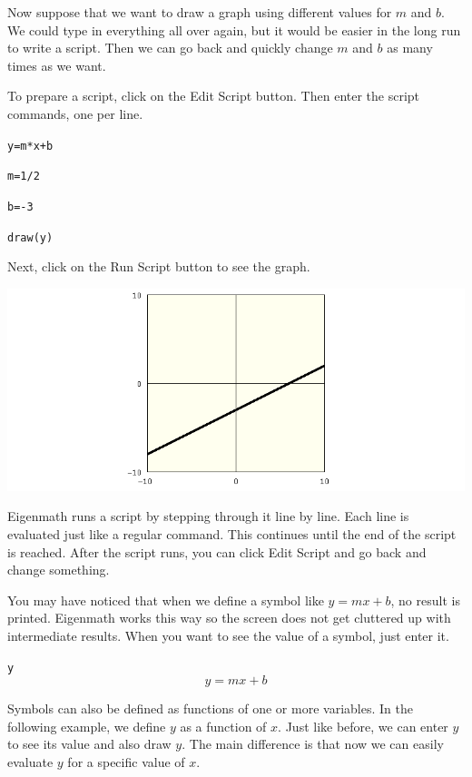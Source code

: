 \documentclass[12pt,openany]{report}
\begin{document}
\noindent
Now suppose that we want to draw a graph
using different values for $m$ and $b$.
We could type in everything all over again, but it would be easier
in the long run to write a script.
Then we can go back and quickly change $m$ and $b$ as many times as we want.

\medskip
\noindent
To prepare a script, click on the Edit Script button.
Then enter the script commands, one per line.

\medskip
{\tt y=m*x+b}

{\tt m=1/2}

{\tt b=-3}

{\tt draw(y)}

\medskip
\noindent
Next, click on the Run Script button to see the graph.

\medskip
\begin{center}
\includegraphics[scale=0.5]{1.png}
\end{center}

\medskip
\noindent
Eigenmath runs a script by stepping through it line by line.
Each line is evaluated just like a regular command.
This continues until the end of the script is reached.
After the script runs, you can click Edit Script and go back and change something.

\newpage

\noindent
You may have noticed that when we define a symbol
like $y=mx+b$, no result is printed.
Eigenmath works this way so the screen does not get cluttered
up with intermediate results.
When you want to see the value of a symbol, just enter it.

\medskip
{\tt y}
$$y=mx+b$$

\medskip
\noindent
Symbols can also be defined as functions of one or more variables.
In the following example, we define $y$ as a function of $x$.
Just like before, we can enter $y$ to see its value and
also draw $y$.
The main difference is that now we can easily evaluate $y$ for
a specific value of $x$.
\end{document}
